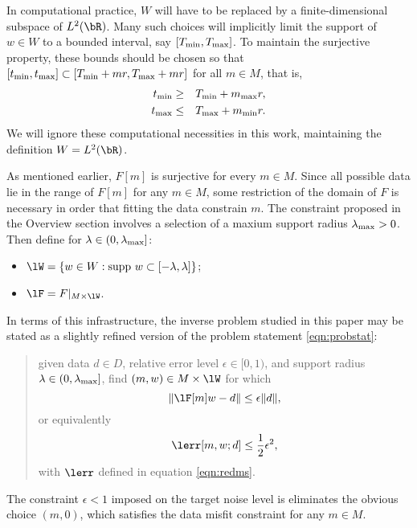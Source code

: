  In computational practice, $W$ will have to be replaced by a
finite-dimensional subspace of $L^2(\bR)$. Many such choices will
implicitly limit the support of $w \in W$ to a bounded interval, say
$[T_{\rm min},T_{\rm max}]$. To maintain the surjective property,
these bounds should be chosen so that $[t_{\rm min}, t_{\rm max}]
\subset [T_{\rm min}+mr,T_{\rm max}+mr]$ for all $m \in M$, that is,
\begin{eqnarray}
  \label{eqn:dombounds}
  t_{\rm min} &\ge & T_{\rm min}+m_{\rm max}r,\nonumber\\
  t_{\rm max} &\le & T_{\rm max}+m_{\rm min}r.
\end{eqnarray}
We will ignore these computational necessities in this work,
maintaining the definition $W=L^2(\bR)$.

As mentioned earlier, $F[m]$ is surjective for every
$m \in M$. Since all possible data lie in the range of $F[m]$ for any
$m \in M$, some restriction of the domain
of $F$ is necessary in order that fitting the data constrain
$m$. The constraint proposed in the
Overview section involves a selection of a maxium support radius
$\lambda_{\rm max} >0$. Then define for $\lambda \in (0,\lambda_{\rm max}]$:
\begin{itemize}
\item $\lW = \{w \in W:
  \mbox{supp }w \subset [-\lambda,\lambda]\}$;
\item $\lF = F|_{M \times \lW}$.
\end{itemize}

In terms of this infrastructure, the inverse problem studied in 
this paper may be stated as a slightly refined version of the problem statement
\ref{eqn:probstat}: 

\begin{quote}
  given data $d \in D$, relative error level $\epsilon \in
  [0,1)$, and support radius $\lambda \in (0, \lambda_{\rm
    max}]$, find $(m,w) \in M \times \lW$ for which 
\begin{equation}
  \label{eqn:probstat0}  \|\lF[m]w-d\| \le \epsilon\|d\|,
\end{equation}
or equivalently
\begin{equation}
  \label{eqn:probstat1}
  \lerr[m,w;d] \le \frac{1}{2}\epsilon^2,
\end{equation}
with $\lerr$ defined in equation \ref{eqn:redms}.
\end{quote}

 The constraint $\epsilon < 1$ imposed on the
target noise level is eliminates the obvious choice $(m,0)$, which
satisfies the data misfit constraint for any $m \in M$. 


